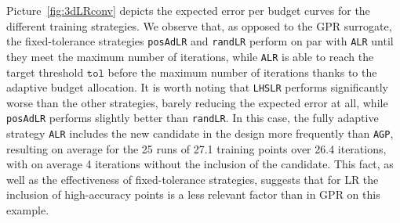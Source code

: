 Picture~\ref{fig:3dLRconv} depicts the expected error per budget curves for the different training strategies. 
We observe that, as opposed to the GPR surrogate, the fixed-tolerance strategies \texttt{posAdLR} and \texttt{randLR} perform on par with \texttt{ALR} until they meet the maximum number of iterations, while \texttt{ALR} is able to reach the target threshold $\texttt{tol}$ before the maximum number of iterations thanks to the adaptive budget allocation.
It is worth noting that \texttt{LHSLR} performs significantly worse than the other strategies, barely reducing the expected error at all, while \texttt{posAdLR} performs slightly better than \texttt{randLR}. 
In this case, the fully adaptive strategy \texttt{ALR} includes the new candidate in the design more frequently than \texttt{AGP}, resulting on average for the 25 runs of 27.1 training points over 26.4 iterations, with on average 4 iterations without the inclusion of the candidate.
This fact, as well as the effectiveness of fixed-tolerance strategies, suggests that for LR the inclusion of high-accuracy points is a less relevant factor than in GPR on this example. \medskip


